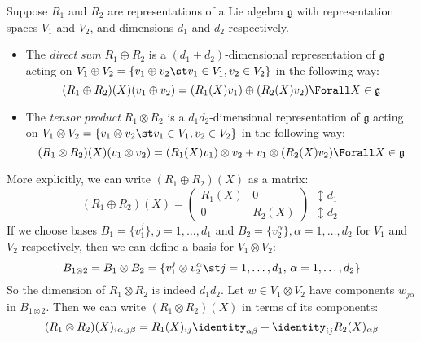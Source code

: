 \documentclass{jknotes}
\begin{document}
\begin{defn}
    Suppose \(R_1\) and \(R_2\) are representations of a Lie algebra \(\mathfrak{g}\) with representation spaces \(V_1\) and \(V_2\), and dimensions \(d_1\) and \(d_2\) respectively.
    \begin{itemize}
        \item The \emph{direct sum} \(R_1 \oplus R_2\) is a \((d_1+d_2)\)-dimensional representation of \(\mathfrak{g}\) acting on \(V_1\oplus V_2 = \{v_1\oplus v_2 \st v_1 \in V_1, v_2 \in V_2\}\) in the following way:
            \begin{equation}
                (R_1 \oplus R_2)(X)(v_1\oplus v_2) = (R_1(X)v_1)\oplus(R_2(X)v_2) \Forall X \in \mathfrak{g}
            \end{equation}
        \item The \emph{tensor product} \(R_1 \otimes R_2\) is a \(d_1d_2\)-dimensional representation of \(\mathfrak{g}\) acting on \(V_1\otimes V_2 = \{v_1 \otimes v_2 \st v_1 \in V_1, v_2 \in V_2\}\) in the following way:
            \begin{equation}
                (R_1\otimes R_2)(X)(v_1 \otimes v_2) = (R_1(X)v_1)\otimes v_2 + v_1\otimes(R_2(X)v_2) \Forall X \in \mathfrak{g}
            \end{equation}
    \end{itemize}
\end{defn}
More explicitly, we can write \((R_1\oplus R_2)(X)\) as a matrix:
\begin{equation}
    (R_1\oplus R_2)(X) = 
    \left(\begin{array}{c|c}
        R_1(X) & 0\\\hline
        0 & R_2(X)
    \end{array}\right)
    \begin{array}{l}
        \updownarrow d_1 \\
        \updownarrow d_2 
    \end{array}
\end{equation}
If we choose bases \(B_1 = \{v_1^j\}, j = 1, \dots, d_1\) and \(B_2=\{v_2^\alpha\}, \alpha = 1,\dots,d_2\) for \(V_1\) and \(V_2\) respectively, then we can define a basis for \(V_1\otimes V_2\):
\begin{equation}
    B_{1\otimes 2} = B_1\otimes B_2 = \{v_1^j\otimes v_2^\alpha \st j = 1,\dots,d_1,\,\alpha = 1,\dots,d_2\}
\end{equation}
So the dimension of \(R_1\otimes R_2\) is indeed \(d_1d_2\). Let \(w \in V_1\otimes V_2\) have components \(w_{j\alpha}\) in \(B_{1\otimes 2}\). Then we can write \((R_1\otimes R_2)(X)\) in terms of its components:
\begin{equation}
    (R_1\otimes R_2)(X)_{i\alpha,j\beta} = R_1(X)_{ij}\identity_{\alpha\beta} + \identity_{ij}R_2(X)_{\alpha\beta}
\end{equation}
\end{document}
